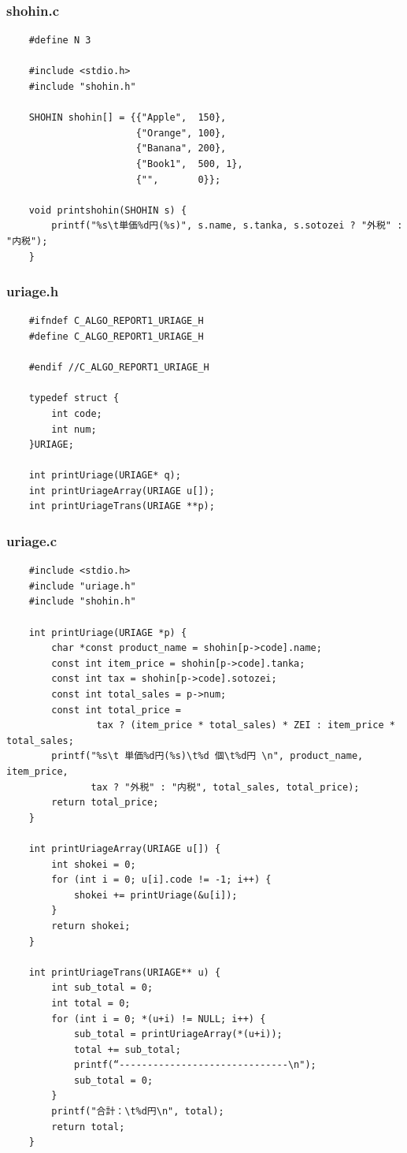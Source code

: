 \documentclass[10pt]{article}
\begin{document}
\subsubsection{shohin.c}
    \begin{lstlisting}
    #define N 3
    
    #include <stdio.h>
    #include "shohin.h"
    
    SHOHIN shohin[] = {{"Apple",  150},
                       {"Orange", 100},
                       {"Banana", 200},
                       {"Book1",  500, 1},
                       {"",       0}};
    
    void printshohin(SHOHIN s) {
        printf("%s\t単価%d円(%s)", s.name, s.tanka, s.sotozei ? "外税" : "内税");
    }

    \end{lstlisting}
\subsubsection{uriage.h}
    \begin{lstlisting}
    #ifndef C_ALGO_REPORT1_URIAGE_H
    #define C_ALGO_REPORT1_URIAGE_H
    
    #endif //C_ALGO_REPORT1_URIAGE_H
    
    typedef struct {
        int code;
        int num;
    }URIAGE;
    
    int printUriage(URIAGE* q);
    int printUriageArray(URIAGE u[]);
    int printUriageTrans(URIAGE **p);
    \end{lstlisting}
    \pagebreak
\subsubsection{uriage.c}
    \begin{lstlisting}
    #include <stdio.h>
    #include "uriage.h"
    #include "shohin.h"
    
    int printUriage(URIAGE *p) {
        char *const product_name = shohin[p->code].name;
        const int item_price = shohin[p->code].tanka;
        const int tax = shohin[p->code].sotozei;
        const int total_sales = p->num;
        const int total_price =
                tax ? (item_price * total_sales) * ZEI : item_price * total_sales;
        printf("%s\t 単価%d円(%s)\t%d 個\t%d円 \n", product_name, item_price,
               tax ? "外税" : "内税", total_sales, total_price);
        return total_price;
    }
    
    int printUriageArray(URIAGE u[]) {
        int shokei = 0;
        for (int i = 0; u[i].code != -1; i++) {
            shokei += printUriage(&u[i]);
        }
        return shokei;
    }

    int printUriageTrans(URIAGE** u) {
        int sub_total = 0;
        int total = 0;
        for (int i = 0; *(u+i) != NULL; i++) {
            sub_total = printUriageArray(*(u+i));
            total += sub_total;
            printf(“------------------------------\n");
            sub_total = 0;
        }
        printf("合計：\t%d円\n", total);
        return total;
    }
    \end{lstlisting}
\end{document}
